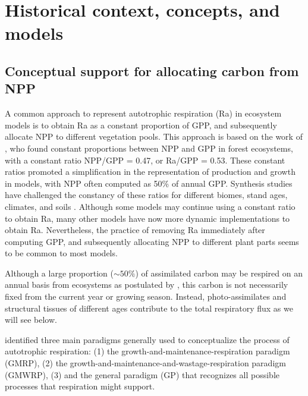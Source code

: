 \documentclass[bg, manuscript]{copernicus}
\begin{document}
\section{Historical context, concepts, and models}
\subsection{Conceptual support for allocating carbon from NPP}
A common approach to represent autotrophic respiration (Ra) in ecosystem models is to obtain Ra as a constant proportion of GPP, and subsequently allocate NPP to different vegetation pools. This approach is based on the work of \citet{Waring1998}, who found constant proportions between NPP and GPP in forest ecosystems, with a constant ratio NPP/GPP = 0.47, or Ra/GPP = 0.53. These constant ratios  promoted  a simplification in the representation of production and growth in models, with NPP often computed as 50\% of annual GPP. Synthesis studies have challenged the constancy of these ratios for different biomes, stand ages, climates, and soils \citep{DeLucia2007, Collalti2019}. 
Although some models may continue using a constant ratio to obtain Ra, many other models have now more dynamic implementations to obtain Ra. Nevertheless, the practice of removing Ra immediately after computing GPP, and subsequently allocating NPP to different plant parts seems to be common to most models. 


Although a large proportion ($\sim 50\%$) of assimilated carbon may be respired on an annual basis from ecosystems as postulated by \citet{Waring1998}, this carbon is not necessarily fixed from the current year or growing season. Instead, photo-assimilates and structural tissues of different ages contribute to the total respiratory flux as we will see below.

\citet{Amthor2000} identified three main paradigms generally used to conceptualize the process of autotrophic respiration: (1) the growth-and-maintenance-respiration paradigm (GMRP), (2) the growth-and-maintenance-and-wastage-respiration paradigm (GMWRP), (3) and the general paradigm (GP) that recognizes all possible processes that respiration might support. 
\end{document}
